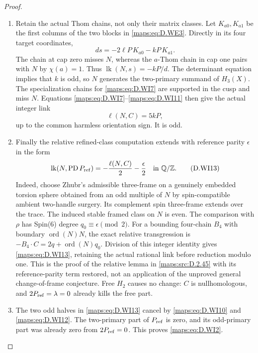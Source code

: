 \begin{proof}
\begin{enumerate}[label=\arabic*.,leftmargin=*]
\item Retain the actual Thom chains, not only their matrix classes.
Let $K_{a0},K_{a1}$ be the first columns of the two blocks in
\eqref{maps:eq:D.WE3}.  Directly in its four target coordinates,
\[
                    d s=-2\ell P\,K_{a0}-kP\,K_{a1}.
 \tag{D.WI11}\label{maps:eq:D.WI11}
\]
The chain at cap zero misses $N$, whereas the $a$-Thom
chain in cap one pairs with $N$ by $\chi(a)=1$.
Thus $\operatorname{lk}(N,s)=-kP/d$.
The determinant equation implies that $k$ is odd, so $N$
generates the two-primary summand of $H_3(X)$.
The specialization chains for \eqref{maps:eq:D.WI7} are supported in the
cusp and miss $N$.  Equations \eqref{maps:eq:D.WI7}--\eqref{maps:eq:D.WI11} then give
the actual integer link
\[
                          \ell(N,C)=5kP,
 \tag{D.WI12}\label{maps:eq:D.WI12}
\]
up to the common harmless orientation sign.  It is odd.

\item Finally the relative refined-class computation extends with
reference parity $\epsilon$ in the form
\[
 \operatorname{lk}(N,\operatorname{PD}P_{\rm ref})
                 =-\frac{\ell(N,C)}2-\frac{\epsilon}2
                                      \quad\text{in }\mathbb Q/\mathbb Z .
 \tag{D.WI13}\label{maps:eq:D.WI13}
\]
Indeed, choose Zhubr's admissible three-frame on a genuinely
embedded torsion sphere obtained from an odd multiple of $N$
by spin-compatible ambient two-handle surgery.  Its complement
spin three-frame extends over the trace.  The induced stable
framed class on $N$ is even.  The comparison with $\rho$ has
Spin(6) degree $q_0\equiv\epsilon\pmod2$.
For a bounding four-chain $B_4$ with boundary
$\operatorname{ord}(N)N$, the exact relative transgression is
$-B_4\cdot C=2q+\operatorname{ord}(N)q_0$.
Division of this integer identity gives \eqref{maps:eq:D.WI13}, retaining
the actual rational link before reduction modulo one.
This is the proof of the relative lemma in \ref{maps:src:D.2.45} with its
reference-parity term restored, not an application of the
unproved general change-of-frame conjecture.
Free $H_2$ causes no change: $C$ is nullhomologous, and
$2P_{\rm ref}=\lambda=0$ already kills the free part.

\item The two odd halves in \eqref{maps:eq:D.WI13} cancel by \eqref{maps:eq:D.WI10} and
\eqref{maps:eq:D.WI12}.  The two-primary part of $P_{\rm ref}$ is zero,
and its odd-primary part was already zero from
$2P_{\rm ref}=0$.  This proves \eqref{maps:eq:D.WI2}.
\end{enumerate}
\end{proof}

